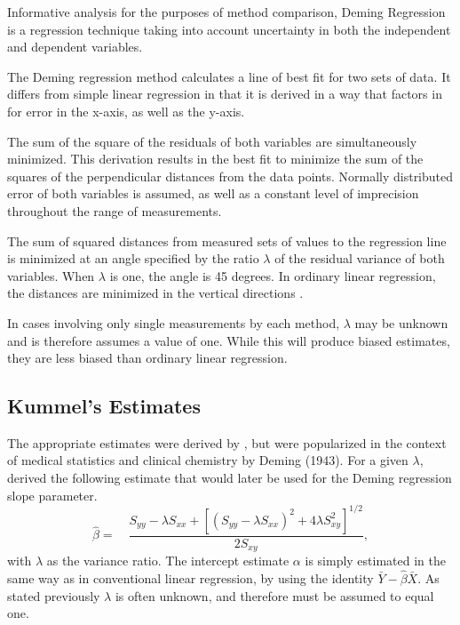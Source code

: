 \documentclass[12pt, a4paper]{report}
\theoremstyle{plain}
\theoremstyle{definition}
\theoremstyle{remark}
\begin{document}
Informative analysis for the purposes of method comparison, Deming Regression is a regression technique taking into account uncertainty in both the independent and dependent variables.
	
The Deming regression method calculates a line of best fit for two sets of data. It differs from simple linear regression in that it is derived in a way that factors in for error in the x-axis, as well as the y-axis. 

The sum of the square of the residuals of both variables are simultaneously minimized. This derivation results in the best fit to minimize the sum of the squares of the perpendicular distances from the data points. Normally distributed error of both variables is assumed, as well as a constant level of imprecision throughout the range of measurements.

The sum of squared distances from measured sets of values to the regression line is minimized at an angle specified by the ratio $\lambda$ of the residual variance of both variables. When $\lambda$ is one, the angle is 45 degrees. In ordinary linear regression, the distances are minimized in the vertical directions \citep{linnet99}.

In cases involving only single measurements by each method, $\lambda$ may be unknown and is therefore assumes a value of one. While this will produce biased estimates, they are less biased than ordinary linear regression.
	
	
\subsection{Kummel's Estimates}

The appropriate estimates were derived by \citet{Kummel}, but were popularized in the context of medical statistics and clinical chemistry by Deming (1943).
For a given $\lambda$, \citet{Kummel} derived the following estimate that would later be used for the Deming regression slope
parameter. 
\begin{equation}
\hat{\beta} =\quad \frac{S_{yy} - \lambda S_{xx}+[(S_{yy} -
	\lambda S_{xx})^{2}+ 4\lambda S^{2}_{xy}]^{1/2}}{2S_{xy}},
\end{equation}
with $\lambda$ as the variance ratio. The intercept estimate $\alpha$ is simply estimated in the same way as in conventional linear
regression, by using the identity $\bar{Y}-\hat{\beta}\bar{X}$. As stated previously $\lambda$ is often unknown, and therefore must be assumed to equal one. 
\end{document}
